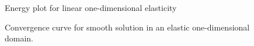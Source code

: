 \begin{figure}[h!]
  \centering
  
  \caption{Energy plot for linear one-dimensional elasticity}
  \label{fig:hep_planeWave}
\end{figure}

\begin{figure}[h!]
  \centering
  \caption{Convergence curve for smooth solution in an elastic one-dimensional domain.}
  \label{fig:hep_planeWave}
\end{figure}

